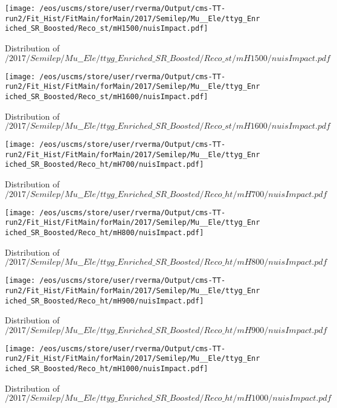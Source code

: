 \begin{figure}
\centering
\texttt{[image: /eos/uscms/store/user/rverma/Output/cms-TT-run2/Fit\_Hist/FitMain/forMain/2017/Semilep/Mu\_\_Ele/ttyg\_Enriched\_SR\_Boosted/Reco\_st/mH1500/nuisImpact.pdf]}
\caption{Distribution of $/2017/Semilep/Mu\_\_Ele/ttyg\_Enriched\_SR\_Boosted/Reco\_st/mH1500/nuisImpact.pdf$}
\end{figure}

\begin{figure}
\centering
\texttt{[image: /eos/uscms/store/user/rverma/Output/cms-TT-run2/Fit\_Hist/FitMain/forMain/2017/Semilep/Mu\_\_Ele/ttyg\_Enriched\_SR\_Boosted/Reco\_st/mH1600/nuisImpact.pdf]}
\caption{Distribution of $/2017/Semilep/Mu\_\_Ele/ttyg\_Enriched\_SR\_Boosted/Reco\_st/mH1600/nuisImpact.pdf$}
\end{figure}

\begin{figure}
\centering
\texttt{[image: /eos/uscms/store/user/rverma/Output/cms-TT-run2/Fit\_Hist/FitMain/forMain/2017/Semilep/Mu\_\_Ele/ttyg\_Enriched\_SR\_Boosted/Reco\_ht/mH700/nuisImpact.pdf]}
\caption{Distribution of $/2017/Semilep/Mu\_\_Ele/ttyg\_Enriched\_SR\_Boosted/Reco\_ht/mH700/nuisImpact.pdf$}
\end{figure}

\begin{figure}
\centering
\texttt{[image: /eos/uscms/store/user/rverma/Output/cms-TT-run2/Fit\_Hist/FitMain/forMain/2017/Semilep/Mu\_\_Ele/ttyg\_Enriched\_SR\_Boosted/Reco\_ht/mH800/nuisImpact.pdf]}
\caption{Distribution of $/2017/Semilep/Mu\_\_Ele/ttyg\_Enriched\_SR\_Boosted/Reco\_ht/mH800/nuisImpact.pdf$}
\end{figure}

\begin{figure}
\centering
\texttt{[image: /eos/uscms/store/user/rverma/Output/cms-TT-run2/Fit\_Hist/FitMain/forMain/2017/Semilep/Mu\_\_Ele/ttyg\_Enriched\_SR\_Boosted/Reco\_ht/mH900/nuisImpact.pdf]}
\caption{Distribution of $/2017/Semilep/Mu\_\_Ele/ttyg\_Enriched\_SR\_Boosted/Reco\_ht/mH900/nuisImpact.pdf$}
\end{figure}

\begin{figure}
\centering
\texttt{[image: /eos/uscms/store/user/rverma/Output/cms-TT-run2/Fit\_Hist/FitMain/forMain/2017/Semilep/Mu\_\_Ele/ttyg\_Enriched\_SR\_Boosted/Reco\_ht/mH1000/nuisImpact.pdf]}
\caption{Distribution of $/2017/Semilep/Mu\_\_Ele/ttyg\_Enriched\_SR\_Boosted/Reco\_ht/mH1000/nuisImpact.pdf$}
\end{figure}


